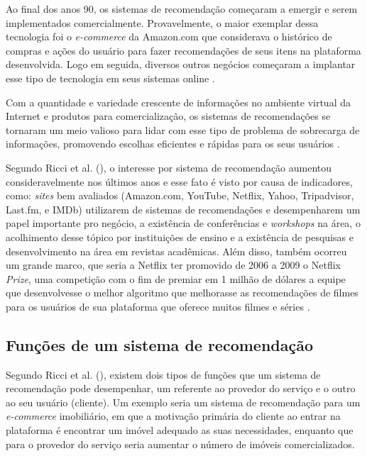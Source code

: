 Ao final dos anos 90, os sistemas de recomendação começaram a emergir e serem implementados comercialmente. Provavelmente, o maior exemplar dessa tecnologia foi o \textit{e-commerce} da Amazon.com que considerava o histórico de compras e ações do usuário para fazer recomendações de seus itens na plataforma desenvolvida. Logo em seguida, diversos outros negócios começaram a implantar esse tipo de tecnologia em seus sistemas online \cite{Ekstrand:2011:CFR:2185827.2185828}.

Com a quantidade e variedade crescente de informações no ambiente virtual da Internet e produtos para comercialização, os sistemas de recomendações se tornaram um meio valioso para lidar com esse tipo de problema de sobrecarga de informações, promovendo escolhas eficientes e rápidas para os seus usuários \cite{Ricci:2010}.

Segundo Ricci et al. (\citeyear{Ricci:2010}), o interesse por sistema de recomendação aumentou consideravelmente nos últimos anos e esse fato é visto por causa de  indicadores, como: \textit{sites} bem avaliados (Amazon.com, YouTube, Netflix, Yahoo, Tripadvisor, Last.fm, e IMDb) utilizarem de sistemas de recomendações e desempenharem um papel importante pro negócio, a existência de conferências e \textit{workshops} na área, o acolhimento desse tópico por instituições de ensino e a existência de pesquisas e desenvolvimento na área em revistas acadêmicas. Além disso, também ocorreu um grande marco, que seria a Netflix ter promovido de 2006 a 2009 o Netflix \textit{Prize}, uma competição com o fim de premiar em 1 milhão de dólares a equipe que desenvolvesse o melhor algoritmo que melhorasse as recomendações de filmes para os usuários de sua plataforma que oferece muitos filmes e séries \cite{netflixprize:2009}.

\subsection{Funções de um sistema de recomendação}

Segundo Ricci et al. (\citeyear{Ricci:2010}), existem dois tipos de funções que um sistema de recomendação pode desempenhar, um referente ao provedor do serviço e o outro ao seu usuário (cliente). Um exemplo seria um sistema de recomendação para um \textit{e-commerce} imobiliário, em que a motivação primária do cliente ao entrar na plataforma é encontrar um imóvel adequado as suas necessidades, enquanto que para o provedor do serviço seria aumentar o número de imóveis comercializados.

